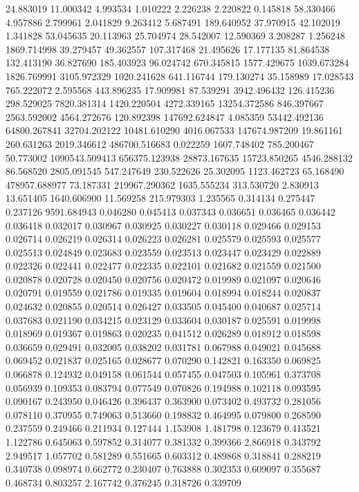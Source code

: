 24.883019
11.000342
4.993534
1.010222
2.226238
2.220822
0.145818
58.330466
4.957886
2.799961
2.041829
9.263412
5.687491
189.640952
37.970915
42.102019
1.341828
53.045635
20.113963
25.704974
28.542007
12.590369
3.208287
1.256248
1869.714998
39.279457
49.362557
107.317468
21.495626
17.177135
81.864538
132.413190
36.827690
185.403923
96.024742
670.345815
1577.429675
1039.673284
1826.769991
3105.972329
1020.241628
641.116744
179.130274
35.158989
17.028543
765.222072
2.595568
443.896235
17.909981
87.539291
3942.496432
126.415236
298.529025
7820.381314
1420.220504
4272.339165
13254.372586
846.397667
2563.592002
4564.272676
120.892398
147692.624847
4.085359
53442.492136
64800.267841
32704.202122
10481.610290
4016.067533
147674.987209
19.861161
260.631263
2019.346612
486700.516683
0.022259
1607.748402
785.200467
50.773002
1090543.509413
656375.123938
28873.167635
15723.850265
4546.288132
86.568520
2805.091545
547.247649
230.522626
25.302095
1123.462723
65.168490
478957.688977
73.187331
219967.290362
1635.555234
313.530720
2.830913
13.651405
1640.606900
11.569258
215.979303
1.235565
0.314134
0.275447
0.237126
9591.684943
0.046280
0.045413
0.037343
0.036651
0.036465
0.036442
0.036418
0.032017
0.030967
0.030925
0.030227
0.030118
0.029466
0.029153
0.026714
0.026219
0.026314
0.026223
0.026281
0.025579
0.025593
0.025577
0.025513
0.024849
0.023683
0.023559
0.023513
0.023447
0.023429
0.022889
0.022326
0.022441
0.022477
0.022335
0.022101
0.021682
0.021559
0.021500
0.020878
0.020728
0.020450
0.020756
0.020472
0.019989
0.021097
0.020646
0.020791
0.019559
0.021786
0.019335
0.019604
0.018994
0.018244
0.020837
0.024632
0.020855
0.020514
0.026427
0.033505
0.045400
0.040687
0.025714
0.037683
0.021190
0.034215
0.023129
0.033604
0.030187
0.025591
0.019998
0.018969
0.019367
0.019863
0.020235
0.041512
0.026289
0.018912
0.018598
0.036659
0.029491
0.032005
0.038202
0.031781
0.067988
0.049021
0.045688
0.069452
0.021837
0.025165
0.028677
0.070290
0.142821
0.163350
0.069825
0.066878
0.124932
0.049158
0.061544
0.057455
0.047503
0.105961
0.373708
0.056939
0.109353
0.083794
0.077549
0.070826
0.194988
0.102118
0.093595
0.090167
0.243950
0.046426
0.396437
0.363900
0.073402
0.493732
0.281056
0.078110
0.370955
0.749063
0.513660
0.198832
0.464995
0.079800
0.268590
0.237559
0.249466
0.211934
0.127444
1.153908
1.481798
0.123679
0.413521
1.122786
0.645063
0.597852
0.314077
0.381332
0.399366
2.866918
0.343792
2.949517
1.057702
0.581289
0.551665
0.603312
0.489868
0.318841
0.288219
0.340738
0.098974
0.662772
0.230407
0.763888
0.302353
0.609097
0.355687
0.468734
0.803257
2.167742
0.376245
0.318726
0.339709
